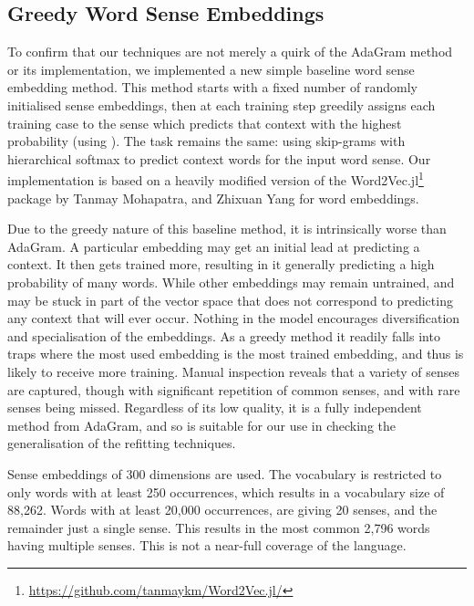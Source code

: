 \documentclass{article} %
\begin{document}
\subsection{Greedy Word Sense Embeddings}

To confirm that our techniques are not merely a quirk of the AdaGram method or its implementation, we implemented a new simple baseline word sense embedding method.
This method starts with a fixed number of randomly initialised sense embeddings, then at each training step greedily assigns each training case to the sense which predicts that context with the highest probability (using ). The task remains the same: using skip-grams with hierarchical softmax to predict context words for the input word sense.
Our implementation is based on a heavily modified version of the Word2Vec.jl\footnote{\url{https://github.com/tanmaykm/Word2Vec.jl/}} package by Tanmay Mohapatra, and Zhixuan Yang  for word embeddings.

Due to the greedy nature of this baseline method, it is intrinsically worse than AdaGram. A particular embedding may get an initial lead at predicting a context. 
It then gets trained more, resulting in it generally predicting a high probability of many words.
While other embeddings may remain untrained, and may be stuck in part of the vector space that does not correspond to predicting any context that will ever occur.
Nothing in the model encourages diversification and specialisation of the embeddings.
As a greedy method it readily falls into traps where the most used embedding is the most trained embedding, and thus is likely to receive more training. Manual inspection reveals that a variety of senses are captured, though with significant repetition of common senses, and with rare senses being missed. Regardless of its low quality, it is a fully independent method from AdaGram, and so is suitable for our use in checking the generalisation of the refitting techniques.

Sense embeddings of 300 dimensions are used.
The vocabulary is restricted to only words with at least 250 occurrences, which results in a vocabulary size of 88,262. Words with at least 20,000 occurrences, are giving 20 senses, and the remainder just a single sense.
This results in the most common 2,796 words having multiple senses.
This is not a near-full coverage of the language. 
\end{document}
